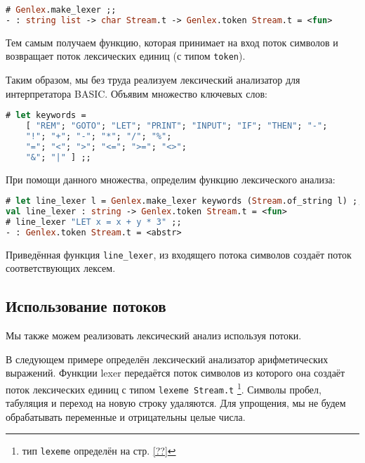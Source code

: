 \begin{lstlisting}[language=OCaml]
# Genlex.make_lexer ;;
- : string list -> char Stream.t -> Genlex.token Stream.t = <fun>
\end{lstlisting}

Тем самым получаем функцию, которая принимает на вход поток символов и
возвращает поток лексических единиц (с типом \texttt{token}).

Таким образом, мы без труда реализуем лексический анализатор для интерпретатора
BASIC. Объявим множество ключевых слов:

\begin{lstlisting}[language=OCaml]
# let keywords =
    [ "REM"; "GOTO"; "LET"; "PRINT"; "INPUT"; "IF"; "THEN"; "-";
    "!"; "+"; "-"; "*"; "/"; "%";
    "="; "<"; ">"; "<="; ">="; "<>";
    "&"; "|" ] ;;
\end{lstlisting}

При помощи данного множества, определим функцию лексического анализа:

\begin{lstlisting}[language=OCaml]
# let line_lexer l = Genlex.make_lexer keywords (Stream.of_string l) ;;
val line_lexer : string -> Genlex.token Stream.t = <fun>
# line_lexer "LET x = x + y * 3" ;;
- : Genlex.token Stream.t = <abstr>
\end{lstlisting}

Приведённая функция \texttt{line\_lexer}, из входящего потока символов создаёт
поток соответствующих лексем.

\subsection{Использование потоков}

Мы также можем реализовать лексический анализ  используя потоки.

В следующем примере определён лексический анализатор арифметических выражений.
Функции lexer передаётся поток символов из которого она создаёт поток
лексических единиц с типом \texttt{lexeme Stream.t} \footnote{тип
\texttt{lexeme} определён на стр. \ref{??}}. Символы пробел, табуляция и
переход на новую строку удаляются. Для упрощения, мы не будем обрабатывать
переменные и отрицательны целые числа.

